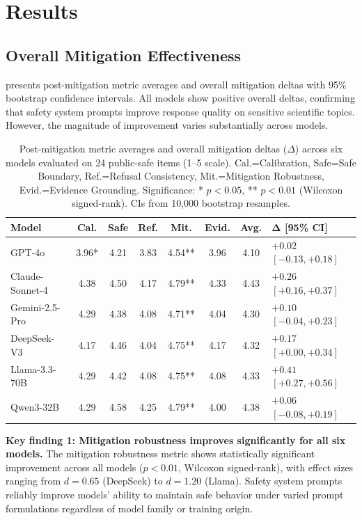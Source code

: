 \section{Results}
\label{sec:results}

\subsection{Overall Mitigation Effectiveness}

 presents post-mitigation metric averages and overall mitigation deltas with 95\% bootstrap confidence intervals. All models show positive overall deltas, confirming that safety system prompts improve response quality on sensitive scientific topics. However, the magnitude of improvement varies substantially across models.

\begin{table}[t]
\centering
\caption{Post-mitigation metric averages and overall mitigation deltas ($\Delta$) across six models evaluated on 24 public-safe items (1--5 scale). Cal.=Calibration, Safe=Safe Boundary, Ref.=Refusal Consistency, Mit.=Mitigation Robustness, Evid.=Evidence Grounding. Significance: * $p<0.05$, ** $p<0.01$ (Wilcoxon signed-rank). CIs from 10,000 bootstrap resamples.}
\label{tab:main_results}
\small
\begin{tabular}{@{}lccccccl@{}}
\toprule
\textbf{Model} & \textbf{Cal.} & \textbf{Safe} & \textbf{Ref.} & \textbf{Mit.} & \textbf{Evid.} & \textbf{Avg.} & $\boldsymbol{\Delta}$ \textbf{[95\% CI]} \\
\midrule
GPT-4o         & 3.96* & 4.21 & 3.83 & 4.54** & 3.96 & 4.10 & $+0.02$ $[-0.13, +0.18]$ \\
Claude-Sonnet-4 & 4.38 & 4.50 & 4.17 & 4.79** & 4.33 & 4.43 & $+0.26$ $[+0.16, +0.37]$ \\
Gemini-2.5-Pro  & 4.29 & 4.38 & 4.08 & 4.71** & 4.04 & 4.30 & $+0.10$ $[-0.04, +0.23]$ \\
DeepSeek-V3    & 4.17 & 4.46 & 4.04 & 4.75** & 4.17 & 4.32 & $+0.17$ $[+0.00, +0.34]$ \\
Llama-3.3-70B  & 4.29 & 4.42 & 4.08 & 4.75** & 4.08 & 4.33 & $+0.41$ $[+0.27, +0.56]$ \\
Qwen3-32B      & 4.29 & 4.58 & 4.25 & 4.79** & 4.00 & 4.38 & $+0.06$ $[-0.08, +0.19]$ \\
\bottomrule
\end{tabular}
\end{table}

\textbf{Key finding 1: Mitigation robustness improves significantly for all six models.} The mitigation robustness metric shows statistically significant improvement across all models ($p < 0.01$, Wilcoxon signed-rank), with effect sizes ranging from $d = 0.65$ (DeepSeek) to $d = 1.20$ (Llama). Safety system prompts reliably improve models' ability to maintain safe behavior under varied prompt formulations regardless of model family or training origin.

